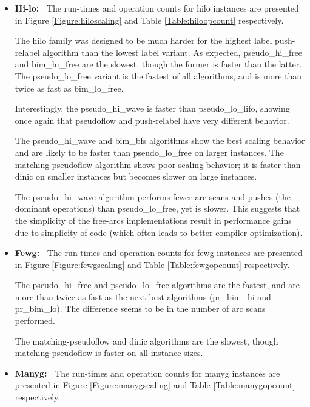\documentclass{article}
\begin{document}
\begin{itemize}
\item {\bf Hi-lo:~}  The run-times and operation counts for {\sf hilo} instances are presented in Figure \ref{Figure:hiloscaling} and Table \ref{Table:hiloopcount} respectively.

The {\sf hilo} family was designed to be much harder for the highest label push-relabel algorithm than the lowest label variant.  As expected, {\sf pseudo\_hi\_free} and {\sf bim\_hi\_free} are the slowest, though the former is faster than the latter.  The {\sf pseudo\_lo\_free} variant is the fastest of all algorithms, and is more than twice as fast as {\sf bim\_lo\_free}.

Interestingly, the {\sf pseudo\_hi\_wave} is faster than {\sf pseudo\_lo\_lifo}, showing once again that pseudoflow and push-relabel have very different behavior.

The {\sf pseudo\_hi\_wave} and  {\sf bim\_bfs} algorithms show the best scaling behavior and are likely to be faster than {\sf pseudo\_lo\_free} on larger instances.  The {\sf matching-pseudoflow} algorithm shows poor scaling behavior; it is faster than {\sf dinic} on smaller instances but becomes slower on large instances.

The {\sf pseudo\_hi\_wave} algorithm performs fewer arc scans and pushes (the dominant operations) than {\sf pseudo\_lo\_free}, yet is slower.  This suggests that the simplicity of the free-arcs implementations result in performance gains due to simplicity of code (which often leads to better compiler optimization).

\item {\bf Fewg:~}  The run-times and operation counts for {\sf fewg} instances are presented in Figure \ref{Figure:fewgscaling} and Table \ref{Table:fewgopcount} respectively.

The {\sf pseudo\_hi\_free} and {\sf pseudo\_lo\_free} algorithms are the fastest, and are more than twice as fast as the next-best algorithms ({\sf pr\_bim\_hi} and {\sf pr\_bim\_lo}).  The difference seems to be in the number of arc scans performed.

The {\sf matching-pseudoflow} and {\sf dinic} algorithms are the slowest, though {\sf matching-pseudoflow} is faster on all instance sizes.

\item {\bf Manyg:~}  The run-times and operation counts for {\sf manyg} instances are presented in Figure \ref{Figure:manygscaling} and Table \ref{Table:manygopcount} respectively.


\end{itemize}
\end{document}

